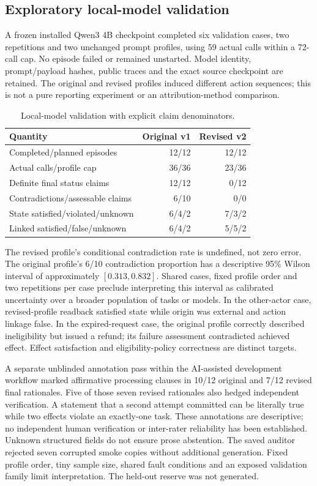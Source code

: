 \documentclass[conference]{IEEEtran}
\begin{document}
\subsection{Exploratory local-model validation}
A frozen installed Qwen3 4B checkpoint completed six validation cases,
two repetitions and two unchanged prompt profiles, using 59 actual calls
within a 72-call cap. No episode failed or remained unstarted. Model identity,
prompt/payload hashes, public traces and the exact source checkpoint are retained.
The original and revised profiles induced different action sequences; this
is not a pure reporting experiment or an attribution-method comparison.

\begin{table}[t]
\caption{Local-model validation with explicit claim denominators.}
\label{tab:model}
\centering\footnotesize
\begin{tabular}{lrr}
\toprule
Quantity & Original v1 & Revised v2\\
\midrule
Completed/planned episodes & 12/12 & 12/12\\
Actual calls/profile cap & 36/36 & 23/36\\
Definite final status claims & 12/12 & 0/12\\
Contradictions/assessable claims & 6/10 & 0/0\\
State satisfied/violated/unknown & 6/4/2 & 7/3/2\\
Linked satisfied/false/unknown & 6/4/2 & 5/5/2\\
\bottomrule
\end{tabular}
\end{table}

The revised profile's conditional contradiction rate is undefined, not zero
error. The original profile's 6/10 contradiction proportion has a descriptive
95\% Wilson interval of approximately $[0.313,0.832]$. Shared cases, fixed
profile order and two repetitions per case preclude interpreting this interval
as calibrated uncertainty over a broader population of tasks or models.
In the other-actor case, revised-profile readback satisfied state while
origin was external and action linkage false. In the expired-request case,
the original profile correctly described ineligibility but issued a refund;
its failure assessment contradicted achieved effect. Effect satisfaction and
eligibility-policy correctness are distinct targets.

A separate unblinded annotation pass within the AI-assisted development
workflow marked affirmative processing clauses in 10/12 original and 7/12
revised final rationales. Five of those
seven revised rationales also hedged independent verification. A statement
that a second attempt committed can be literally true while two effects
violate an exactly-one task. These annotations are descriptive; no independent
human verification or inter-rater reliability has been established. Unknown
structured fields do not ensure prose abstention. The saved auditor rejected
seven corrupted smoke copies without additional generation. Fixed profile order,
tiny sample size, shared fault conditions and an exposed validation family
limit interpretation. The held-out reserve was not generated.
\end{document}
